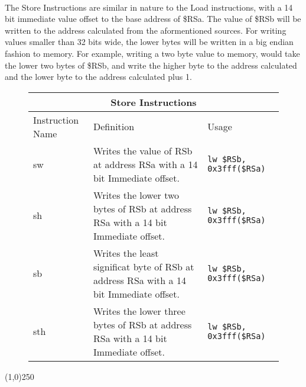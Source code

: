 \documentclass[letterpaper, 11pt]{article}
\begin{document}
\paragraph{} The Store Instructions are similar in nature to the Load instructions, with a 14 bit immediate value offset to the base address of \$RSa.
The value of \$RSb will be written to the address calculated from the aformentioned sources. For writing values smaller than 32 bits wide, the lower
bytes will be written in a big endian fashion to memory. For example, writing a two byte value to memory, would take the lower two bytes of \$RSb, and write
the higher byte to the address calculated and the lower byte to the address calculated plus 1. 
\begin{figure}[!h]
	\begin{center}
		\begin{tabular}{|l|l|l|}
			\hline
			\multicolumn{3}{c}{Store Instructions} \\ \hline
			Instruction Name	& Definition																			& Usage 							\\ \hline
			sw					& Writes the value of RSb at address RSa with a 14 bit Immediate offset.				& \texttt{lw \$RSb, 0x3fff(\$RSa)}	\\ \hline
			sh					& Writes the lower two bytes of RSb at address RSa with a 14 bit Immediate offset.		& \texttt{lw \$RSb, 0x3fff(\$RSa)}	\\ \hline
			sb					& Writes the least significat byte of RSb at address RSa with a 14 bit Immediate offset.& \texttt{lw \$RSb, 0x3fff(\$RSa)}	\\ \hline
			sth					& Writes the lower three bytes of RSb at address RSa with a 14 bit Immediate offset.	& \texttt{lw \$RSb, 0x3fff(\$RSa)}	\\ \hline
		 		\end{tabular} 
	\end{center}
	
\end{figure}

\begin{center}
	\line(1,0){250}
\end{center}
\end{document}
